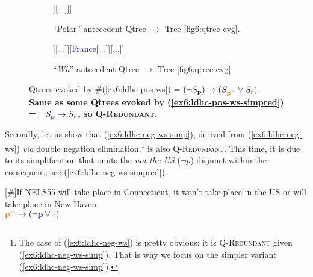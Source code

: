 \begin{figure}[H]
	\centering
	\begin{subfigure}[b]{.45\linewidth}
		\centering
		\begin{forest}
			[CS[\textcolor{blue}{US}] [\textcolor{blue}{$\neg$US}[\textcolor{orange}{Lower Saxony}[\fbox{\textcolor{brown}{Göttingen}}][\textcolor{brown}{...}]][\textcolor{orange}{...}]]]
		\end{forest}
		\caption{``Polar'' antecedent Qtree $\rightarrow$ Tree \ref{fig6:qtree-cvg}.}
	\end{subfigure}
	\hfill
	\begin{subfigure}[b]{.45\linewidth}
		\centering
		\begin{forest}
			[CS[\textcolor{blue}{US}] [\textcolor{blue}{Germany}[\textcolor{orange}{Lower Saxony}[\fbox{\textcolor{brown}{Göttingen}}][\textcolor{brown}{...}]][\textcolor{orange}{...}]][\textcolor{blue}{France}[\textcolor{orange}{...}]][\textcolor{blue}{...}]]
		\end{forest}
		\caption{``\textit{Wh}'' antecedent Qtree $\rightarrow$ Tree \ref{fig6:qtree-cvg}.}
	\end{subfigure}
	\caption[]{Qtrees evoked by \#(\ref{ex6:ldhc-pos-ws}) = $(\neg S_{\textbf{\textcolor{blue}{p}}}) \rightarrow (S_{\textbf{\textcolor{orange}{p$^+$}}} \vee S_{\textbf{\textcolor{brown}{r}}})$.\\\textbf{Same as some Qtrees evoked by (\ref{ex6:ldhc-pos-ws-simpred}) = $\neg S_{\textbf{\textcolor{blue}{p}}} \rightarrow S_{\textbf{\textcolor{brown}{r}}}$, so \textsc{Q-Redundant}.}}\label{fig6:qtree-nust(cvg)}
\end{figure}

Secondly, let us show that (\ref{ex6:ldhc-neg-ws-simp}), derived from (\ref{ex6:ldhc-neg-ws}) \textit{via} double negation elimination,\footnote{The case of (\ref{ex6:ldhc-neg-ws}) is pretty obvious: it is \textsc{Q-Redundant} given (\ref{ex6:ldhc-neg-ws-simp}). That is why we focus on the simpler variant (\ref{ex6:ldhc-neg-ws-simp}).} is also \textsc{Q-Redundant}. This time, it is due to its simplification that omits the \textit{not the US} ($\neg p$) disjunct within the consequent; see (\ref{ex6:ldhc-neg-ws-simpred}).

\begin{exe}
	[\#]{If NELS55 will take place in Connecticut, it won't take place in the US or will take place in New Haven.\\
		$\pplus\rightarrow(\neg \p \vee \s)$}
	\label{ex6:ldhc-neg-ws-simpred}
\end{exe}

